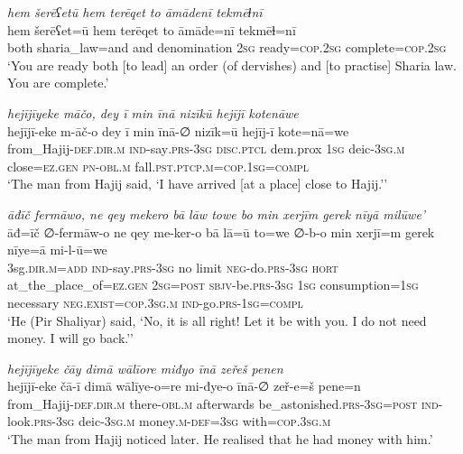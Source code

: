 \ea \label{ŽP.94}
\textit{hem šerēʕetū hem terēqet to āmādenī tekmēɫnī} \\ 
\gll hem šerēʕet=ū hem terēqet to āmāde=nī tekmēɫ=nī \\ 
 both sharia\_law=and and denomination \textsc{2sg} ready\textsc{=cop}\textsc{.\textsc{2sg}} complete\textsc{=cop}\textsc{.\textsc{2sg}} \\ 
\glt `You are ready both [to lead] an order (of dervishes) and [to practise] Sharia law. You are complete.'
\z 
 
\ea \label{ŽP.102}
\textit{hejījīyeke māčo, dey ī min īnā nizīkū hejījī kotenāwe} \\ 
\gll hejījī-eke m-āč-o dey ī min īnā-∅ nizīk=ū hejīj-ī kote=nā=we \\ 
 from\_Hajij\textsc{-def}\textsc{.dir}\textsc{.m} \textsc{ind-}say\textsc{.prs}\textsc{-3sg} \textsc{disc.ptcl} dem.prox \textsc{1sg} deic\textsc{-3sg}\textsc{.m} close\textsc{\textsc{=ez.gen}} \textsc{pn}\textsc{-obl}\textsc{.m} fall\textsc{.pst}\textsc{.ptcp}\textsc{.m}\textsc{=cop}\textsc{.\textsc{1sg}}\textsc{=compl} \\ 
\glt `The man from Hajij said, ‘I have arrived [at a place] close to Hajij.’'
\z 
 
\ea \label{ŽP.105}
\textit{āđīč fermāwo, ne qey mekero bā lāw towe bo min xerjīm gerek nīyā milūwe’} \\ 
\gll āđ=īč ∅-fermāw-o ne qey me-ker-o bā lā=ū to=we ∅-b-o min xerjī=m gerek nīye=ā mi-l-ū=we \\ 
 3sg\textsc{.dir}\textsc{.m}\textsc{=add} \textsc{ind-}say\textsc{.prs}\textsc{-3sg} no limit \textsc{neg-}do\textsc{.prs}\textsc{-3sg} \textsc{hort} at\_the\_place\_of\textsc{\textsc{=ez.gen}} \textsc{2sg}\textsc{=\textsc{post}} \textsc{sbjv-}be\textsc{.prs}\textsc{-3sg} \textsc{1sg} consumption\textsc{=\textsc{1sg}} necessary \textsc{\textsc{neg.}exist}\textsc{=cop}\textsc{.3sg}\textsc{.m} \textsc{ind-}go\textsc{.prs}\textsc{-\textsc{1sg}}\textsc{=compl} \\ 
\glt `He (Pir Shaliyar) said, ‘No, it is all right! Let it be with you. I do not need money. I will go back.’'
\z 
 
\ea \label{ŽP.112}
\textit{hejījīyeke čāy dimā wālīore miđyo īnā zeřeš penen} \\ 
\gll hejījī-eke čā-ī dimā wālīye-o=re mi-đye-o īnā-∅ zeř-e=š pene=n \\ 
 from\_Hajij\textsc{-def}\textsc{.dir}\textsc{.m} there\textsc{-obl}\textsc{.m} afterwards be\_astonished\textsc{.prs}\textsc{-3sg}\textsc{=\textsc{post}} \textsc{ind-}look\textsc{.prs}\textsc{-3sg} deic\textsc{-3sg}\textsc{.m} money\textsc{.m}\textsc{-def}\textsc{=3sg} with\textsc{=cop}\textsc{.3sg}\textsc{.m} \\ 
\glt `The man from Hajij noticed later. He realised that he had money with him.'
\z 
 
